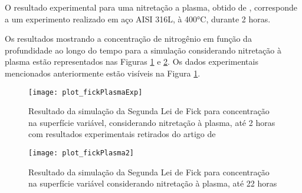 O resultado experimental para uma nitretação a plasma, obtido de \cite{moskalioviene2011modeling}, corresponde a um experimento realizado em aço AISI 316L, à 400°C, durante 2 horas.

Os resultados mostrando a concentração de nitrogênio em função da profundidade ao longo do tempo para a simulação considerando nitretação à plasma estão representados nas Figuras \ref{fig:csvar-plasma1} e \ref{fig:csvar-plasma2}. Os dados experimentais mencionados anteriormente estão visíveis na Figura \ref{fig:csvar-plasma1}.


\begin{figure}[!htb]
\centering
	\caption{Resultado da simulação da Segunda Lei de Fick para concentração na superfície variável, considerando nitretação à plasma, até 2 horas com resultados experimentais retirados do artigo de \cite{moskalioviene2011modeling}}
	\texttt{[image: plot\_fickPlasmaExp]}
	\label{fig:csvar-plasma1}
	\centering
\end{figure}

\begin{figure}[!htb]
\centering
	\caption{Resultado da simulação da Segunda Lei de Fick para concentração na superfície variável considerando nitretação à plasma, até 22 horas}
	\texttt{[image: plot\_fickPlasma2]}
	\label{fig:csvar-plasma2}
	\centering
\end{figure}

\FloatBarrier